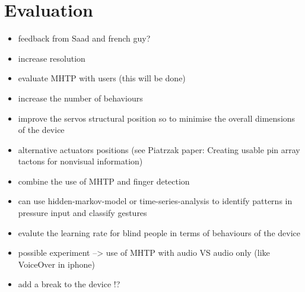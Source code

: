 \chapter{Evaluation}


\begin{itemize}
	\item feedback from Saad and french guy?
	\item increase resolution
    \item evaluate MHTP with users (this will be done)
    \item increase the number of behaviours
    \item improve the servos structural position so to minimise the overall dimensions of the device
    \item alternative actuators positions (see Piatrzak paper: Creating usable pin array tactons for nonvisual information)
    \item combine the use of MHTP and finger detection
    \item can use hidden-markov-model or time-series-analysis to identify patterns in pressure input and classify gestures
    \item evalute the learning rate for blind people in terms of behaviours of the device
    \item possible experiment --> use of MHTP with audio VS audio only (like VoiceOver in iphone)
    \item add a break to the device !?
\end{itemize}
